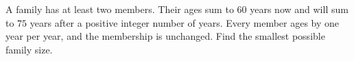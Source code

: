 A family has at least two members. Their ages sum to $60$ years now and will sum to $75$ years after a positive integer number of years. Every member ages by one year per year, and the membership is unchanged. Find the smallest possible family size.
